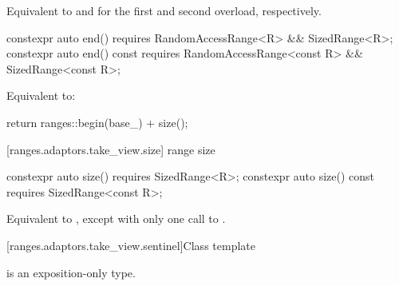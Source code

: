 \begin{itemdescr}
\pnum
\effects Equivalent to  and
 for the first and second
overload, respectively.
\end{itemdescr}

%
\begin{itemdecl}
constexpr auto end() requires RandomAccessRange<R> && SizedRange<R>;
constexpr auto end() const
  requires RandomAccessRange<const R> && SizedRange<const R>;
\end{itemdecl}

\begin{itemdescr}
\pnum
\effects Equivalent to:
\begin{codeblock}
return ranges::begin(base_) + size();
\end{codeblock}
\end{itemdescr}

[ranges.adaptors.take_view.size]{ range size}

%
\begin{itemdecl}
constexpr auto size() requires SizedRange<R>;
constexpr auto size() const requires SizedRange<const R>;
\end{itemdecl}

\begin{itemdescr}
\pnum
\effects Equivalent to
, except with
only one call to .
\end{itemdescr}

[ranges.adaptors.take_view.sentinel]{Class template }

\pnum
{} is an exposition-only type.

